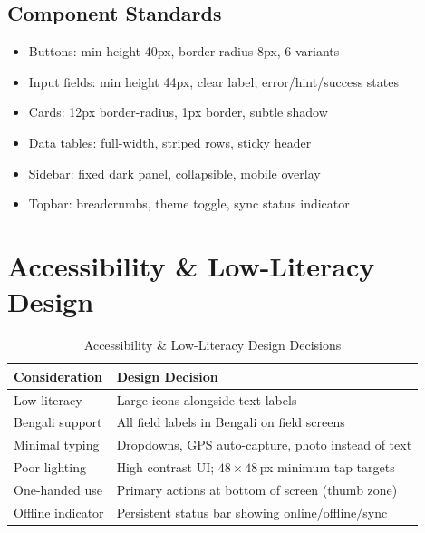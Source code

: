 \subsection{Component Standards}
\begin{itemize}[nosep]
    \item Buttons: min height 40px, border-radius 8px, 6 variants
    \item Input fields: min height 44px, clear label, error/hint/success states
    \item Cards: 12px border-radius, 1px border, subtle shadow
    \item Data tables: full-width, striped rows, sticky header
    \item Sidebar: fixed dark panel, collapsible, mobile overlay
    \item Topbar: breadcrumbs, theme toggle, sync status indicator
\end{itemize}

\section{Accessibility \& Low-Literacy Design}
\begin{table}[H]
\centering
\caption{Accessibility \& Low-Literacy Design Decisions}
\label{tab:a11y}
\begin{tabularx}{\textwidth}{@{}lX@{}}
\toprule
Consideration & Design Decision \\
\midrule
Low literacy & Large icons alongside text labels \\
Bengali support & All field labels in Bengali on field screens \\
Minimal typing & Dropdowns, GPS auto-capture, photo instead of text \\
Poor lighting & High contrast UI; $48\times48$\,px minimum tap targets \\
One-handed use & Primary actions at bottom of screen (thumb zone) \\
Offline indicator & Persistent status bar showing online/offline/sync \\
\bottomrule
\end{tabularx}
\end{table}
